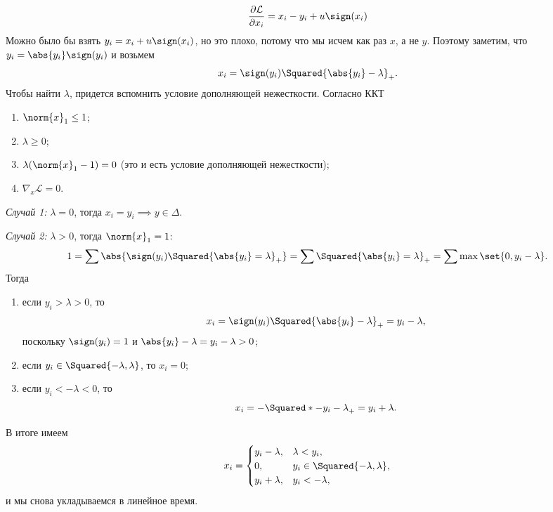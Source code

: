 \begin{equation*}
    \frac{\partial \mathcal{L}}{\partial x_i} = x_i - y_i + u\sign(x_i) %
\end{equation*}
Можно было бы взять $y_i = x_i + u\sign(x_i)$, но это плохо, потому что мы исчем как раз $x$, а не $y$. Поэтому заметим, что $y_i = \abs{y_i}\sign(y_i)$ и возьмем
\begin{equation*}
    x_i = \sign(y_i)\Squared{\abs{y_i} - \lambda}_{+}.
\end{equation*}
Чтобы найти $\lambda$, придется вспомнить условие дополняющей нежесткости. Согласно ККТ
\begin{enumerate}
    \item $\norm{x}_1 \leq 1$;
    \item $\lambda \geq 0$;
    \item $\lambda(\norm{x}_1 - 1) = 0$ (это и есть условие дополняющей нежесткости);
    \item $\nabla_x\mathcal{L} = 0$.
\end{enumerate}
\textit{Случай 1:} $\lambda = 0$, тогда $x_i = y_i \implies y \in \Delta$.

\textit{Случай 2:} $\lambda > 0$, тогда $\norm{x}_1 = 1$:
\begin{equation*}
    1 = \sum \abs{\sign(y_i)\Squared{\abs{y_i} = \lambda}_{+}} = \sum \Squared{\abs{y_i} = \lambda}_{+} = \sum \max\set{0, y_i - \lambda}. 
\end{equation*}
Тогда
\begin{enumerate}
    \item если $y_i > \lambda > 0$, то 
    \begin{equation*}
        x_i = \sign(y_i)\Squared{\abs{y_i} - \lambda}_{+} = y_i - \lambda,
    \end{equation*}
    поскольку $\sign(y_i) = 1$ и $\abs{y_i} - \lambda = y_i - \lambda > 0$;
    \item если $y_i \in \Squared{-\lambda, \lambda}$, то $x_i = 0$;
    \item если $y_i < -\lambda < 0$, то 
    \begin{equation*}
        x_i = -\Squared*{-y_i - \lambda}_{+} = y_i + \lambda.
    \end{equation*}
\end{enumerate}
В итоге имеем
\begin{equation*}
    x_i = \begin{cases} y_i - \lambda, & \lambda < y_i, \\
                        0, & y_i \in \Squared{-\lambda, \lambda}, \\
                        y_i + \lambda, & y_i < -\lambda, \end{cases}
\end{equation*} 
и мы снова укладываемся в линейное время.